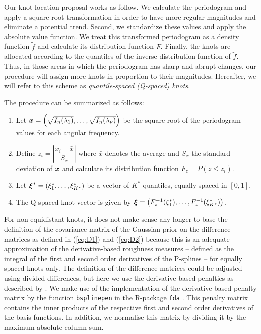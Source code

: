 \documentclass[twocolumn,final]{svjour3}
\newcommand{\bm}[1]{\mbox{\boldmath $#1$}}
\begin{document}
Our knot location proposal works as follow.  We calculate the periodogram and apply a square root transformation in order to have more regular magnitudes and eliminate a potential trend.  Second, we standardize these values and apply the absolute value function.  We treat this transformed periodogram as a density function $\widetilde{f}$ and calculate its distribution function $F$.  Finally, the knots are allocated according to the quantiles of the inverse distribution function of $\widetilde{f}$.  Thus, in those areas in which the periodogram has sharp and abrupt changes, our procedure will assign more knots in proportion to their magnitudes. Hereafter, we will refer to this scheme as {\em  quantile-spaced (Q-spaced) knots}.%

The procedure can be summarized as follows:
\begin{enumerate}
	\item Let $\bm{x} = \left (\sqrt{I_n(\lambda_1)}, \dots, \sqrt{I_n(\lambda_{\nu})} \right)$ be the square root of the periodogram values for each angular frequency.
	\item Define $z_i = \left|\dfrac{x_i - \bar{x}}{S_x} \right|$ where $\bar{x}$ denotes the average and $S_x$ the standard deviation of ${\bm x}$ and calculate its distribution function $F_z = P(z \leq z_i)$.
	\item Let $\bm{\xi}^* = \left(\xi_1^*,\dots,\xi_{K^*}^* \right)$ be a vector of $K^*$ quantiles, equally spaced in $[0,1]$.
	\item The Q-spaced knot vector is given by $\bm{\xi} = \left(F_{z}^{-1}(\xi^*_1),\dots, F_{z}^{-1}(\xi^*_{K^*}) \right)$.
	
\end{enumerate}

For non-equidistant knots, it does not make sense any longer to base the definition of the covariance matrix of the Gaussian prior  on the  difference matrices as defined in (\ref{eq:D1}) and (\ref{eq:D2}) because this is an adequate approximation of the derivative-based roughness measures -- defined as the integral of the first and second order derivatives of the P-splines -- 
for equally spaced knots only. The definition of the difference matrices could be adjusted using divided differences, but here we use the derivative-based penalties as described by \cite{WoodSimon2017Pwdb}. We make use of the implementation of the derivative-based penalty matrix  by the function {\tt bsplinepen} in the R-package {\tt fda} \citep{fda}. This penalty matrix contains the inner products of the respective first and second order derivatives of the basis functions. In addition, we normalise this matrix by dividing it by the maximum absolute column sum.
\end{document}
